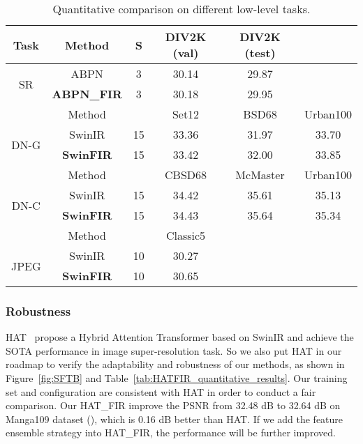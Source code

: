 \documentclass[10pt,twocolumn,letterpaper]{article}
\begin{document}
 
\begin{table}[!t]
	\centering
\scalebox{0.78}
	{
		\begin{tabular}{cccccc}
			\hline
			Task & Method & S & DIV2K (val) & DIV2K (test) & 
			\\ 
			\hline
			\multirow{2}{*}{SR}
			& ABPN & 3
			& 30.14
			& 29.87
			& 
			\\
			& \textbf{ABPN\_FIR} & 3
			& 30.18
			& 29.95
			& 
			\\
			\hline
			\hline
			& Method &  & Set12 & BSD68 & Urban100
			\\ 
			\hline
			\multirow{2}{*}{DN-G}
			& SwinIR & 15
			& 33.36
			& 31.97
			& 33.70
			\\
			& \textbf{SwinFIR} & 15
			& 33.42
			& 32.00
			& 33.85
			\\
			\hline
			\hline
			& Method &  & CBSD68 & McMaster & Urban100
			\\ 
			\hline
			\multirow{2}{*}{DN-C}
			& SwinIR & 15
			& 34.42
			& 35.61
			& 35.13
			\\
			& \textbf{SwinFIR} & 15
			& 34.43
			& 35.64
			& 35.34
			\\
			\hline     
			\hline
			& Method &  & Classic5 &  & 
			\\ 
			\hline
			\multirow{2}{*}{JPEG}
			& SwinIR & 10
			& 30.27
			& 
			& 
			\\
			& \textbf{SwinFIR} & 10
			& 30.65
			& 
			& 
			\\
			\hline          
	\end{tabular}}
\caption{Quantitative comparison on different low-level tasks.}
	\label{tab:ABPN}
\end{table}
 
\subsubsection{Robustness}
HAT~\cite{chen2022activating} propose a Hybrid Attention Transformer based on SwinIR and achieve the SOTA performance in image super-resolution task. So we also put HAT in our roadmap to verify the adaptability and robustness of our methods, as shown in Figure~\ref{fig:SFTB} and Table~\ref{tab:HATFIR_quantitative_results}. Our training set and configuration are consistent with HAT in order to conduct a fair comparison.
Our HAT\_FIR improve the PSNR from 32.48 dB to 32.64 dB on Manga109 dataset (), which is 0.16 dB better than HAT. If we add the feature ensemble strategy into HAT\_FIR, the performance will be further improved. 
\end{document}
